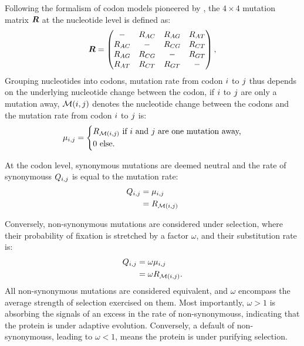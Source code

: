 Following the formalism of \gls{codon} models pioneered by \citet{Muse1994}, the $4 \times 4$ mutation matrix $\bm{R}$ at the nucleotide level is defined as:
\begin{equation}
\label{eq:mutrates}
\bm{R} = \begin{pmatrix}
- & {R_{AC}} & 		{R_{AG}} & 		{R_{AT}} \\
{R_{AC}} & - & {R_{CG}} &		{R_{CT}} \\
{R_{AG}} & 		{R_{CG}} & - & {R_{GT}} \\
{R_{AT}} & 		{R_{CT}} & 		{R_{GT}} & -
\end{pmatrix},
\end{equation}
Grouping nucleotides into \glspl{codon}, mutation rate from \gls{codon} ${i}$ to ${j}$ thus depends on the underlying nucleotide change between the \gls{codon}, if ${i}$ to ${j}$ are only a mutation away, $\mathcal{M}({i}, {j})$ denotes the nucleotide change between the \glspl{codon} and the mutation rate from \gls{codon} ${i}$ to ${j}$ is:
\begin{equation}
\mu_{{i}, {j}} = 
\begin{dcases}
 R_{\mathcal{M}({i}, {j})} \text{ if ${i}$ and ${j}$ are one mutation away,} \\
 0 \text{ else.}
\end{dcases}
\end{equation}

At the \gls{codon} level, synonymous mutations are deemed \gls{neutral} and the rate of \glspl{synonymous} ${Q_{{i}, {j}}}$ is equal to the mutation rate: 
\begin{align}
Q_{{i}, {j}} & = \mu_{{i}, {j}} \\
				  & = R_{\mathcal{M}({i}, {j})}
\end{align}

Conversely, non-synonymous mutations are considered under selection, where their probability of fixation is stretched by a factor $\omega$, and their \gls{substitution} rate is:
\begin{align}
Q_{{i}, {j}} & = \omega \mu_{{i}, {j}} \\
					& = \omega R_{\mathcal{M}({i}, {j})}.
\end{align}
All non-synonymous mutations are considered equivalent, and $\omega$ encompass the average strength of selection exercised on them.
Most importantly, $\omega>1$ is absorbing the signals of an excess in the rate of \glspl{non-synonymous}, indicating that the protein is under adaptive evolution.
Conversely, a default of \glspl{non-synonymous}, leading to $\omega<1$, means the protein is under purifying selection.


